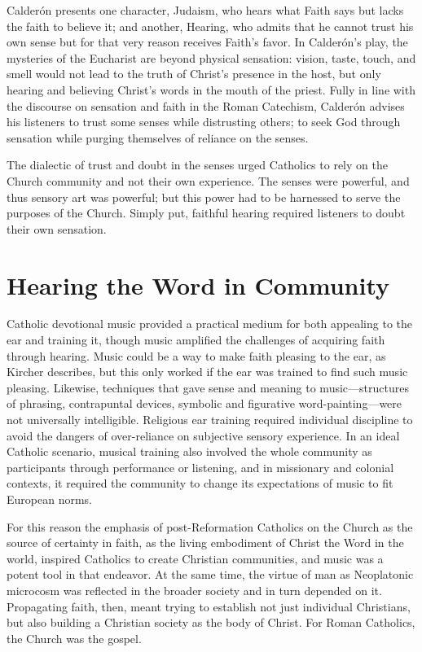 Calderón presents one character, Judaism, who hears what Faith says but lacks the faith to believe it; and another, Hearing, who admits that he cannot trust his own sense but for that very reason receives Faith's favor.
In Calderón's play, the mysteries of the Eucharist are beyond physical sensation: vision, taste, touch, and smell would not lead to the truth of Christ's presence in the host, but only hearing and believing Christ's words  in the mouth of the priest.
Fully in line with the discourse on sensation and faith in the Roman Catechism, Calderón advises his listeners to trust some senses while distrusting others; to seek God through sensation while purging themselves of reliance on the senses.

The dialectic of trust and doubt in the senses urged Catholics to rely on the Church community and not their own experience.
The senses were powerful, and thus sensory art was powerful; but this power had to be harnessed to serve the purposes of the Church.
Simply put, faithful hearing required listeners to doubt their own sensation.



\section{Hearing the Word in Community}

Catholic devotional music provided a practical medium for both appealing to the ear and training it, though music amplified the challenges of acquiring faith through hearing.
Music could be a way to make faith pleasing to the ear, as Kircher  describes, but this only worked if the ear was trained to find such music pleasing.
Likewise, techniques that gave sense and meaning to music---structures of phrasing, contrapuntal devices, symbolic and figurative word-painting---were not universally intelligible.
Religious ear training required individual discipline to avoid the dangers of over-reliance on subjective sensory experience.
In an ideal Catholic scenario, musical training also involved the whole community as participants through performance or listening, and in missionary and colonial contexts, it required the community to change its expectations of music to fit European norms.

For this reason the emphasis of post-Reformation Catholics on the Church as the source of certainty in faith, as the living embodiment of Christ the Word in the world, inspired Catholics to create Christian communities, and music was a potent tool in that endeavor.
At the same time, the virtue of man as Neoplatonic microcosm was reflected in the broader society and in turn depended on it.
Propagating faith, then, meant trying to establish not just individual Christians, but also building a Christian society as the body of Christ.
For Roman Catholics, the Church was the gospel.

